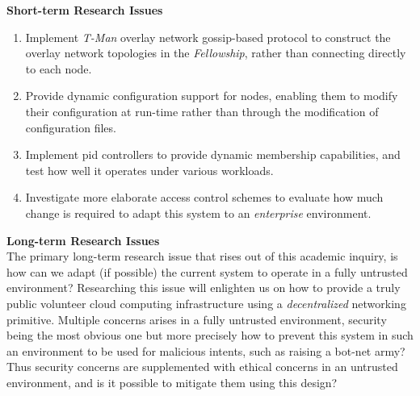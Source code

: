 \documentclass[12pt, titlepage]{uo_temp}
\begin{document}
     \textbf{Short-term Research Issues}\\
     \begin{enumerate} 
     \item Implement \emph{T-Man} overlay network gossip-based protocol to construct the
       overlay network topologies in the \emph{Fellowship}, rather than connecting
       directly to each node.
     \item Provide dynamic configuration support for nodes, enabling them to modify their
       configuration at run-time rather than through the modification of configuration
       files. 
     \item Implement \gls{pid} controllers to provide dynamic membership capabilities, and
       test how well it operates under various workloads.
     \item Investigate more elaborate access control schemes to evaluate how much change
       is required to adapt this system to an \emph{enterprise} environment. 
     \end{enumerate}
     
     \textbf{Long-term Research Issues}\\ 
     The primary long-term research issue that rises out of this academic inquiry, is how
     can we adapt (if possible) the current system to operate in a fully untrusted
     environment? Researching this issue will enlighten us on how to provide a truly
     public volunteer cloud computing infrastructure using a \emph{decentralized}
     networking primitive. Multiple concerns arises in a fully untrusted environment,
     security being the most obvious one but more precisely how to prevent this system in
     such an environment to be used for malicious intents, such as raising a bot-net army?
     Thus security concerns are supplemented with ethical concerns in an untrusted
     environment, and is it possible to mitigate them using this design?
     

\clearpage
 
 
\end{document}
